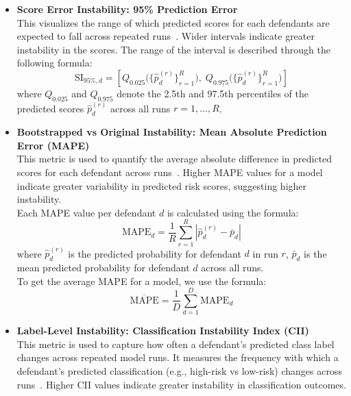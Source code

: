 \documentclass[12pt]{article}
\begin{document}
\begin{itemize}
  \item \textbf{Score Error Instability: 95\% Prediction Error}\\
    \tabto{2em} This visualizes the range of which predicted scores for each defendants are expected to fall across repeated runs~\cite{riley2023stability}. Wider intervals indicate greater instability in the scores. The range of the interval is described through the following formula: \\
    \[
    \text{SI}_{95\%,d} =
    \left[
    Q_{0.025}\big(\{\hat{p}_d^{(r)}\}_{r=1}^{R}\big),
    \;
    Q_{0.975}\big(\{\hat{p}_d^{(r)}\}_{r=1}^{R}\big)
    \right]
    \] 
    where $ Q_{0.025} $ and $ Q_{0.975} $ denote the 2.5th and 97.5th percentiles of the predicted scores $ \hat{p}_d^{(r)} $ across all runs $ r = 1, \dots, R $.

  \item \textbf{Bootstrapped vs Original Instability: Mean Absolute Prediction Error (MAPE)}\\
    \tabto{2em} This metric is used to quantify the average absolute difference in predicted scores for each defendant across runs~\cite{riley2023stability}. Higher MAPE values for a model indicate greater variability in predicted risk scores, suggesting higher instability.\\

    Each MAPE value per defendant $ d $ is calculated using the formula:
    \[ \text{MAPE}_d=\frac{1}{R}\sum_{r=1}^{R}|\hat{p}_{d}^{(r)}-\bar{p}_d| \]
    where $ \hat{p}_d^{(r)} $ is the predicted probability for  defendant $ d $ in run $ r $, $ \bar{p}_d $ is the mean predicted probability for  defendant $ d $ across all runs. \\

    To get the average MAPE for a model, we use the formula:
    \[ \overline{\text{MAPE}}=\frac{1}{D}\sum_{d=1}^{D}\text{MAPE}_d \]

  \item \textbf{Label-Level Instability: Classification Instability Index (CII)}\\ 
    \tabto{2em} This metric is used to capture how often a defendant's predicted class label changes across repeated model runs. It measures the frequency with which a defendant's predicted classification (e.g., high-risk vs low-risk) changes across runs~\cite{riley2023stability}. Higher CII values indicate greater instability in classification outcomes.\\


\end{itemize}
\end{document}
